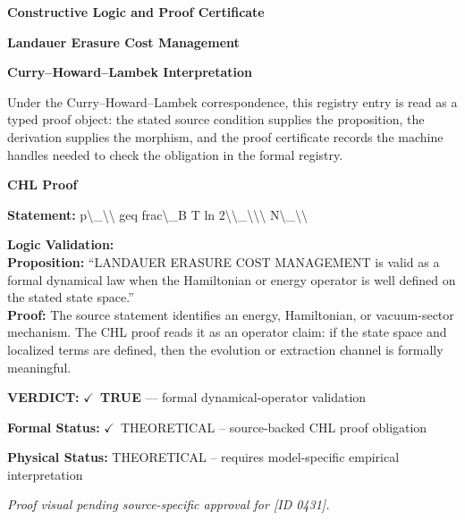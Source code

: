\clearpage
\begingroup\tzpsupportsetup
\noindent\textbf{\fontsize{10.8pt}{12.8pt}\selectfont [ID 0431] Constructive Logic and Proof Certificate}\par
\noindent\textbf{\fontsize{10pt}{12pt}\selectfont Landauer Erasure Cost Management}\par
\vspace{0.45em}
\begingroup
\footnotesize
\setlength{\parskip}{0.22em}
\setlength{\parindent}{0pt}
\noindent\textbf{Curry--Howard--Lambek Interpretation}\par
Under the Curry--Howard--Lambek correspondence, this registry entry is read as a typed proof
object: the stated source condition supplies the proposition, the derivation supplies the
morphism, and the proof certificate records the machine handles needed to check the obligation
in the formal registry.

\vspace{0.45em}
\noindent\textbf{CHL Proof}\par
\textbf{Statement:} p\textbackslash{}\_\textbackslash{}\textbackslash{} geq frac\textbackslash{}\_B T ln 2\textbackslash{}\textbackslash{}\_\textbackslash{}\textbackslash{}\textbackslash{} N\textbackslash{}\_\textbackslash{}\textbackslash{}

\textbf{Logic Validation:}\\
\textbf{Proposition:} ``LANDAUER ERASURE COST MANAGEMENT is valid as a formal dynamical law when the Hamiltonian
or energy operator is well defined on the stated state space.''\\
\textbf{Proof:} The source statement identifies an energy, Hamiltonian, or vacuum-sector mechanism. The
CHL proof reads it as an operator claim: if the state space and localized terms are
defined, then the evolution or extraction channel is formally meaningful.

\textbf{VERDICT:} \ensuremath{\checkmark}\ \textbf{TRUE} --- formal dynamical-operator validation

\textbf{Formal Status:} \ensuremath{\checkmark}\ THEORETICAL -- source-backed CHL proof obligation

\textbf{Physical Status:} THEORETICAL -- requires model-specific empirical interpretation
\par\vspace{0.45em}
\par
\vfill
\begingroup\footnotesize\itshape
Proof visual pending source-specific approval for [ID 0431].
\par\endgroup
\vfill
\endgroup
\endgroup
